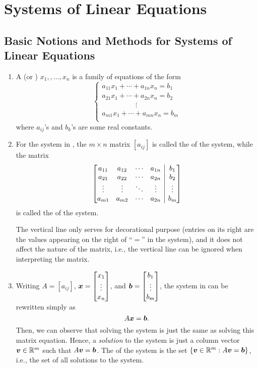 \section{Systems of Linear Equations}
\label{sect:sle}
\subsection{Basic Notions and Methods for Systems of Linear Equations}
\begin{enumerate}
\item\label{it:sle} A  (or
) \(x_1,,\dotsc,x_n\) is a family of equations of the form
\[
\begin{cases}
a_{11}x_1+\dotsb+a_{1n}x_{n}=b_1\\
a_{21}x_1+\dotsb+a_{2n}x_{n}=b_2\\
\hspace{2cm}\vdots\\
a_{m1}x_1+\dotsb+a_{mn}x_{n}=b_m\\
\end{cases}
\]
where \(a_{ij}\)'s and \(b_k\)'s are some real constants.

\item For the system in , the \(m\times n\) matrix
\([a_{ij}]\) is called the  of the system, while the
matrix
\[
\left[
\begin{array}{@{}cccc|c@{}}
a_{11}&a_{12}&\cdots&a_{1n}&b_1\\
a_{21}&a_{22}&\cdots&a_{2n}&b_2\\
\vdots&\vdots&\ddots&\vdots&\vdots\\
a_{m1}&a_{m2}&\cdots&a_{2n}&b_m
\end{array}
\right]
\]
is called the  of the system.

\begin{note}
The vertical line only serves for decorational purpose (entries on its right
are the values appearing on the right of ``\(=\)'' in the system), and it does
not affect the nature of the matrix, i.e., the vertical line can be ignored
when interpreting the matrix.
\end{note}

\item Writing \(A=[a_{ij}]\), \(\vect{x}=\mqty[x_1\\\vdots\\ x_n]\), and
\(\vect{b}=\mqty[b_1\\ \vdots\\ b_m]\), the system in  can be
rewritten simply as
\[
A\vb*{x}=\vb*{b}.
\]
Then, we can observe that solving the system is just the same as solving this
matrix equation. Hence, a \emph{solution} to the system is just a column vector
\(\vb*{v}\in\mathbb{R}^m\) such that \(A\vb*{v}=\vb*{b}\). The 
of the system is the set \(\{\vb*{v}\in\mathbb{R}^m:A\vb*{v}=\vb*{b}\}\), i.e., the
set of all solutions to the system.


\end{enumerate}
